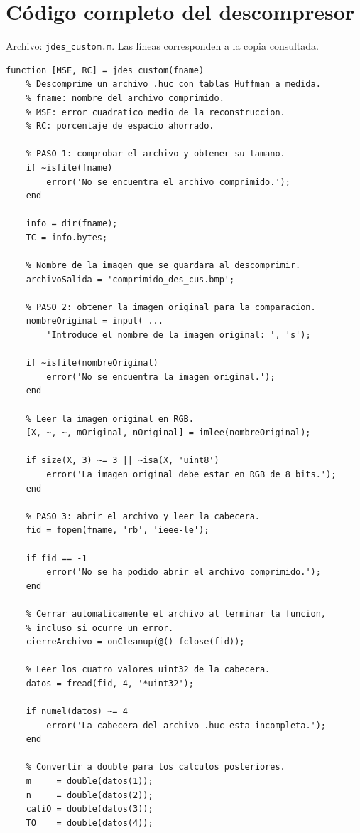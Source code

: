 \documentclass[11pt,a4paper,oneside]{report}
\begin{document}
\chapter{Código completo del descompresor}\label{src:jdes_custom.m}

Archivo: \texttt{jdes\_custom.m}. Las líneas corresponden a la copia consultada.

\begin{lstlisting}
function [MSE, RC] = jdes_custom(fname)
    % Descomprime un archivo .huc con tablas Huffman a medida.
    % fname: nombre del archivo comprimido.
    % MSE: error cuadratico medio de la reconstruccion.
    % RC: porcentaje de espacio ahorrado.

    % PASO 1: comprobar el archivo y obtener su tamano.
    if ~isfile(fname)
        error('No se encuentra el archivo comprimido.');
    end

    info = dir(fname);
    TC = info.bytes;

    % Nombre de la imagen que se guardara al descomprimir.
    archivoSalida = 'comprimido_des_cus.bmp';

    % PASO 2: obtener la imagen original para la comparacion.
    nombreOriginal = input( ...
        'Introduce el nombre de la imagen original: ', 's');

    if ~isfile(nombreOriginal)
        error('No se encuentra la imagen original.');
    end

    % Leer la imagen original en RGB.
    [X, ~, ~, mOriginal, nOriginal] = imlee(nombreOriginal);

    if size(X, 3) ~= 3 || ~isa(X, 'uint8')
        error('La imagen original debe estar en RGB de 8 bits.');
    end

    % PASO 3: abrir el archivo y leer la cabecera.
    fid = fopen(fname, 'rb', 'ieee-le');

    if fid == -1
        error('No se ha podido abrir el archivo comprimido.');
    end

    % Cerrar automaticamente el archivo al terminar la funcion,
    % incluso si ocurre un error.
    cierreArchivo = onCleanup(@() fclose(fid));

    % Leer los cuatro valores uint32 de la cabecera.
    datos = fread(fid, 4, '*uint32');

    if numel(datos) ~= 4
        error('La cabecera del archivo .huc esta incompleta.');
    end

    % Convertir a double para los calculos posteriores.
    m     = double(datos(1));
    n     = double(datos(2));
    caliQ = double(datos(3));
    TO    = double(datos(4));


\end{lstlisting}
\end{document}
